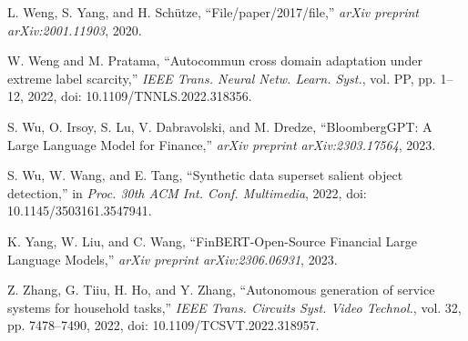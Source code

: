 \documentclass[a4paper,10pt]{article}
\begin{document}
\begin{thebibliography}{1}
L. Weng, S. Yang, and H. Schütze, ``File/paper/2017/file,'' \emph{arXiv preprint arXiv:2001.11903}, 2020.

W. Weng and M. Pratama, ``Autocommun cross domain adaptation under extreme label scarcity,'' \emph{IEEE Trans. Neural Netw. Learn. Syst.}, vol. PP, pp. 1--12, 2022, doi: 10.1109/TNNLS.2022.318356.

S. Wu, O. Irsoy, S. Lu, V. Dabravolski, and M. Dredze, ``BloombergGPT: A Large Language Model for Finance,'' \emph{arXiv preprint arXiv:2303.17564}, 2023.

S. Wu, W. Wang, and E. Tang, ``Synthetic data superset salient object detection,'' in \emph{Proc. 30th ACM Int. Conf. Multimedia}, 2022, doi: 10.1145/3503161.3547941.

K. Yang, W. Liu, and C. Wang, ``FinBERT-Open-Source Financial Large Language Models,'' \emph{arXiv preprint arXiv:2306.06931}, 2023.

Z. Zhang, G. Tiiu, H. Ho, and Y. Zhang, ``Autonomous generation of service systems for household tasks,'' \emph{IEEE Trans. Circuits Syst. Video Technol.}, vol. 32, pp. 7478--7490, 2022, doi: 10.1109/TCSVT.2022.318957.

\end{thebibliography}

% 
% 
\end{document}
